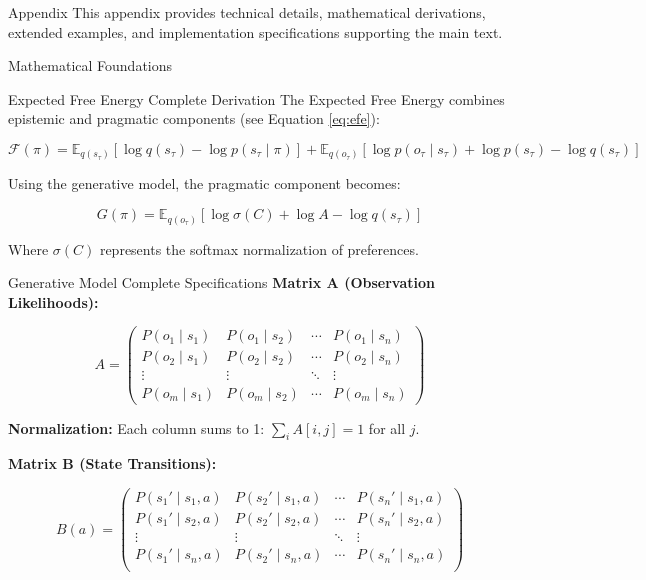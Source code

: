 \documentclass[
  ignorenonframetext,
]{beamer}
\author{\texorpdfstring{}{}}
\date{}
\begin{document}
\begin{frame}[fragile]{Appendix}
\protect{}\label{sec:appendix}
This appendix provides technical details, mathematical derivations,
extended examples, and implementation specifications supporting the main
text.

\begin{block}{Mathematical Foundations}
\protect{}\label{sec:mathematical_foundations}
\begin{block}{Expected Free Energy Complete Derivation}
\protect{}\label{expected-free-energy-complete-derivation}
The Expected Free Energy combines epistemic and pragmatic components
(see Equation \eqref{eq:efe}):

\begin{equation}
\mathcal{F}(\pi) = \mathbb{E}_{q(s_\tau)}[\log q(s_\tau) - \log p(s_\tau \mid \pi)] + \mathbb{E}_{q(o_\tau)}[\log p(o_\tau \mid s_\tau) + \log p(s_\tau) - \log q(s_\tau)]
\label{eq:efe_complete}
\end{equation}

Using the generative model, the pragmatic component becomes:

\begin{equation}
G(\pi) = \mathbb{E}_{q(o_\tau)}[\log \sigma(C) + \log A - \log q(s_\tau)]
\label{eq:pragmatic_generative}
\end{equation}

Where \(\sigma(C)\) represents the softmax normalization of preferences.
\end{block}

\begin{block}{Generative Model Complete Specifications}
\protect{}\label{generative-model-complete-specifications}
\textbf{Matrix A (Observation Likelihoods):}

\[A = \begin{pmatrix}
P(o_1 \mid s_1) & P(o_1 \mid s_2) & \cdots & P(o_1 \mid s_n) \\
P(o_2 \mid s_1) & P(o_2 \mid s_2) & \cdots & P(o_2 \mid s_n) \\
\vdots & \vdots & \ddots & \vdots \\
P(o_m \mid s_1) & P(o_m \mid s_2) & \cdots & P(o_m \mid s_n)
\end{pmatrix}\]

\textbf{Normalization:} Each column sums to 1: \(\sum_i A[i,j] = 1\) for
all \(j\).

\textbf{Matrix B (State Transitions):}

\[B(a) = \begin{pmatrix}
P(s_1' \mid s_1,a) & P(s_2' \mid s_1,a) & \cdots & P(s_n' \mid s_1,a) \\
P(s_1' \mid s_2,a) & P(s_2' \mid s_2,a) & \cdots & P(s_n' \mid s_2,a) \\
\vdots & \vdots & \ddots & \vdots \\
P(s_1' \mid s_n,a) & P(s_2' \mid s_n,a) & \cdots & P(s_n' \mid s_n,a) \\
\end{pmatrix}\]


\end{block}
\end{block}
\end{frame}
\end{document}

